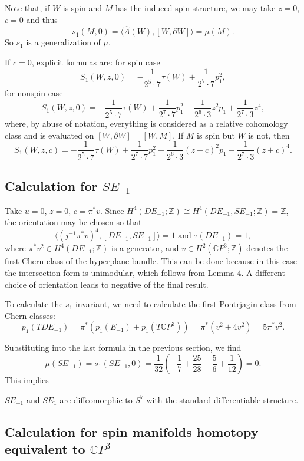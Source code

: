 \documentclass[twoside]{article}
\begin{document}
Note that, if $W$ is spin and $M$ has the induced spin structure, we may take $z = 0$, $c = 0$ and thus 
\[
s_1(M, 0) = \langle \widehat{A}(W),[W, \partial W]\rangle = \mu(M). 
\]
So $s_1$ is a generalization of $\mu$. 

If $c = 0$, explicit formulas are:
for spin case
\[
S_{1}(W, z,0) = -\frac{1}{2^{5}  \cdot 7}  \tau(W) + \frac{1}{2^{7}  \cdot 7} p_{1}^{2},  
\]
for nonspin case
\[
S_{1}(W, z,0) = -\frac{1}{2^{5}  \cdot 7} \tau(W) + \frac{1}{2^{7}  \cdot 7} p_{1}^{2} 
-\frac{1}{2^{6}  \cdot 3} z^{2} p_{1} + \frac{1}{2^{7}  \cdot 3} z^{4} , 
\]
where, by abuse of notation, 
everything is considered as a relative cohomology class and is evaluated on $[W, \partial W] = [W, M]$. If $M$ is spin but $W$ is not, then
\[
S_{1}(W, z,c) = -\frac{1}{2^{5}  \cdot 7} \tau(W) + \frac{1}{2^{7}  \cdot 7} p_{1}^{2} 
-\frac{1}{2^{6}  \cdot 3} (z + c)^{2} p_{1} + \frac{1}{2^{7}  \cdot 3} (z + c)^{4} . 
\]

\subsection{Calculation for \texorpdfstring{$SE_{-1}$}{SE{-1}}}
Take $u = 0$, $z = 0$, $c = \pi^*v$. Since $H^4(DE_{-1};\mathbb{Z}) \cong  H^4(DE_{-1},SE_{-1};\mathbb{Z}) = \mathbb{Z}$, the orientation may be chosen so that
\[
\langle(j^{-1}\pi^*v)^4,[DE_{-1},SE_{-1}]\rangle = 1\text{ and }\tau(DE_{-1}) = 1, 
\]
where $\pi^*v^2\in H^4(DE_{-1};\mathbb{Z})$ is a generator, and $v\in H^2(\mathbb{C}P^3;\mathbb{Z})$ denotes the first Chern class of the hyperplane bundle. This can be done because in this case the intersection form is unimodular, which follows from Lemma 4. A different choice of orientation leads to negative of the final result. 

To calculate the $s_1$ invariant, we need to calculate the first Pontrjagin class from Chern classes: 
\[
p_1(TDE_{-1}) = \pi^*(p_1(E_{-1}) + p_1(T\mathbb{C}P^3)) = \pi^*(v^2 + 4v^2) = 5\pi^*v^2. \]

Substituting into the last formula in the previous section, we find
\[
\mu(SE_{-1}) = s_1(SE_{-1},0) = \frac{1}{32}(-\frac{1}{7} + \frac{25}{28}-\frac{5}{6} + \frac{1}{12}) = 0. 
\]
This implies
\begin{thm}
	$SE_{-1}$ and $SE_{1}$ are diffeomorphic to $S^7$ with the standard differentiable structure. 
\end{thm}




\subsection{Calculation for spin manifolds homotopy equivalent to \texorpdfstring{$\mathbb{C}P^3$}{CP3}}
\end{document}
